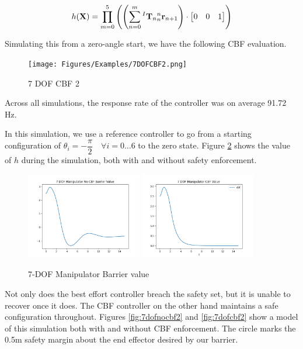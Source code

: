 \begin{align}
    h(\mathbf{X}) =  \prod_{m = 0}^5 \left ( \left (\sum_{n=0}^m {^I\mathbf{T}_n}{^n_n\mathbf{r}_{n+1}} \right) \cdot \begin{bmatrix} 0 & 0 & 1\end{bmatrix} \right )
\end{align}

\noindent Simulating this from a zero-angle start, we have the following CBF evaluation.

\begin{figure}[H]
    \centering
    \texttt{[image: Figures/Examples/7DOFCBF2.png]}
    \caption{7 DOF CBF 2}
    \label{fig:7dofcbf1}
\end{figure}

\noindent Across all simulations, the response rate of the controller was on average 91.72 Hz.

\noindent In this simulation, we use a reference controller to go from a starting configuration of $\theta_i = -\dfrac{\pi}{2} \quad \forall i= 0\hdots6$ to the zero state. Figure \ref{fig:7dofbarriervalue2} shows the value of $h$ during the simulation, both with and without safety enforcement.

\begin{figure}[H]
    \centering
    \includegraphics[width=0.45\textwidth]{Figures/Examples/7DOF/7DOFNoCBFValue.png}
    \includegraphics[width=0.45\textwidth]{Figures/Examples/7DOF/7DOFCBFValue.png}
    \caption{7-DOF Manipulator Barrier value}
    \label{fig:7dofbarriervalue2}
\end{figure}

\noindent Not only does the best effort controller breach the safety set, but it is unable to recover once it does. The CBF controller on the other hand maintains a safe configuration throughout. Figures \ref{fig:7dofnocbf2} and \ref{fig:7dofcbf2} show a model of this simulation both with and without CBF enforcement. The circle marks the 0.5m safety margin about the end effector desired by our barrier.

